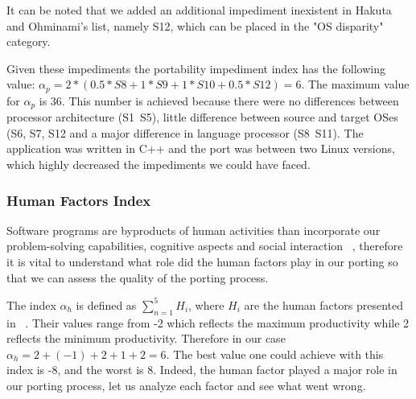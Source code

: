 It can be noted that we added an additional impediment inexistent in Hakuta and
Ohminami's list, namely S12, which can be placed in the "OS disparity" category.

Given these impediments the portability impediment index has the following
value: $\alpha_p = 2 * (0.5 * S8 + 1 * S9 + 1 * S10 + 0.5 * S12) = 6$. The
maximum value for $\alpha_p$ is 36. This number is achieved because there were
no differences between processor architecture (S1~S5), little difference between
source and target OSes (S6, S7, S12 and a major difference in language processor
(S8~S11). The application was written in C++ and the port was between two Linux
versions, which highly decreased the impediments we could have faced.

\subsubsection{Human Factors Index}

Software programs are byproducts of human
activities than incorporate our problem-solving capabilities, cognitive aspects
and social interaction ~\cite{b3}, therefore it is vital to understand what role
did the human factors play in our porting so that we can assess the quality of
the porting process. 

The index $\alpha_h$ is defined as $\sum_{n=1}^{5} H_i$, where $H_i$ are the
human factors presented in ~\cite{b2}. Their values range from -2 which reflects
the maximum productivity while 2 reflects the minimum productivity. Therefore
in our case $\alpha_h = 2 + (-1) + 2 + 1 + 2 = 6$. The best value one could
achieve with this index is -8, and the worst is 8. Indeed, the human factor
played a major role in our porting process, let us analyze each factor and see
what went wrong.

